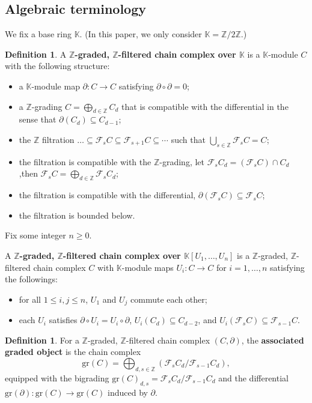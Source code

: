 \documentclass[12pt]{amsart}
\theoremstyle{plain}
\theoremstyle{definition}
\newtheorem{dfn}[thm]{Definition}
\theoremstyle{plain}
\theoremstyle{definition}
\newcommand{\Z}{\mathbb{Z}}
\newcommand{\K}{\mathbb{K}}
\numberwithin{equation}{section}
\begin{document}
\subsection{Algebraic terminology}
We fix a base ring $\K$.
(In this paper, we only consider $\K=\Z/2\Z$.)
\begin{dfn}
A \textbf{$\Z$-graded, $\Z$-filtered chain complex over $\K$} is a $\K$-module $C$ with the following structure:
\begin{itemize}
    \item a $\K$-module map $\partial\colon C\to C$ satisfying $\partial\circ\partial=0$;
    \item a $\Z$-grading $C=\bigoplus_{d\in\Z}C_d$ that is compatible with the differential in the sense that $\partial(C_d)\subseteq C_{d-1}$;
    \item the $\Z$ filtration $\dots\subseteq\mathcal{F}_sC\subseteq \mathcal{F}_{s+1}C\subseteq \cdots$ such that $\bigcup_{s\in\Z}\mathcal{F}_sC=C$;
    \item the filtration is compatible with the $\Z$-grading, let $\mathcal{F}_sC_d=(\mathcal{F}_sC)\cap C_d$ ,then $\mathcal{F}_sC=\bigoplus_{d\in\Z}\mathcal{F}_sC_d$;
    \item the filtration is compatible with the differential, $\partial(\mathcal{F}_sC)\subseteq\mathcal{F}_sC$;
    \item the filtration is bounded below.
\end{itemize}

Fix some integer $n\geq 0$.

A \textbf{$\Z$-graded, $\Z$-filtered chain complex over $\K[U_1,\dots,U_n]$} is a $\Z$-graded, $\Z$-filtered chain complex $C$ with $\K$-module maps $U_i\colon C\to C$ for $i=1,\dots, n$ satisfying the followings:
\begin{itemize}
    \item for all $1\leq i,j\leq n$, $U_1$ and $U_j$ commute each other;
    \item each $U_i$ satisfies $\partial\circ U_i=U_i\circ\partial$, $U_i(C_d)\subseteq C_{d-2}$, and $U_i(\mathcal{F}_sC)\subseteq \mathcal{F}_{s-1}C$.
\end{itemize}
\end{dfn}


\begin{dfn}
For a $\Z$-graded, $\Z$-filtered chain complex $(C,\partial)$, the \textbf{associated graded object} is the chain complex
\[
\mathrm{gr}(C)=\bigoplus_{d,s\in\Z}(\mathcal{F}_sC_d/\mathcal{F}_{s-1}C_d),
\]
equipped with the bigrading $\mathrm{gr}(C)_{d,s}=\mathcal{F}_sC_d/\mathcal{F}_{s-1}C_d$ and the differential $\mathrm{gr}(\partial)\colon \mathrm{gr}(C)\to \mathrm{gr}(C)$ induced by $\partial$.
\end{dfn}
\end{document}
